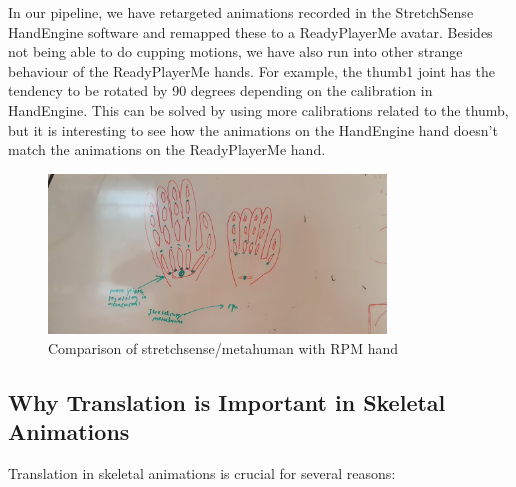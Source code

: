 \documentclass{uva-inf-article}
\begin{document}
In our pipeline, we have retargeted animations recorded in the StretchSense HandEngine software and remapped these to a ReadyPlayerMe avatar. Besides not being able to do cupping motions, we have also run into other strange behaviour of the ReadyPlayerMe hands. For example, the thumb1 joint has the tendency to be rotated by 90 degrees depending on the calibration in HandEngine. This can be solved by using more calibrations related to the thumb, but it is interesting to see how the animations on the HandEngine hand doesn't match the animations on the ReadyPlayerMe hand.


\begin{figure}[hbt!]
    \centering
    \includegraphics[width=0.8\textwidth]{imgs/complexHandNonComplexHand.jpg}
    \caption{Comparison of stretchsense/metahuman with RPM hand}
    \label{fig:ssrpm}
\end{figure}

\subsection{Why Translation is Important in Skeletal Animations}
Translation in skeletal animations is crucial for several reasons:
\end{document}
